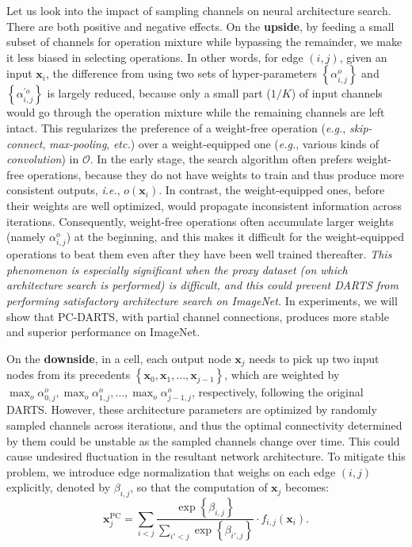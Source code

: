 \documentclass{article} \usepackage{iclr2020_conference,times}
\begin{document}
Let us look into the impact of sampling channels on neural architecture search. There are both positive and negative effects. On the \textbf{upside}, by feeding a small subset of channels for operation mixture while bypassing the remainder, we make it less biased in selecting operations. In other words, for edge $\left(i,j\right)$, given an input $\mathbf{x}_i$, the difference from using two sets of hyper-parameters $\left\{\alpha_{i,j}^o\right\}$ and $\left\{\alpha_{i,j}^{\prime o}\right\}$ is largely reduced, because only a small part ($1/K$) of input channels would go through the operation mixture while the remaining channels are left intact. This regularizes the preference of a weight-free operation (\textit{e.g.}, \textit{skip-connect}, \textit{max-pooling}, \textit{etc.}) over a weight-equipped one (\textit{e.g.}, various kinds of \textit{convolution}) in $\mathcal{O}$. In the early stage, the search algorithm often prefers weight-free operations, because they do not have weights to train and thus produce more consistent outputs, \textit{i.e.}, $o\!\left(\mathbf{x}_i\right)$. In contrast, the weight-equipped ones, before their weights are well optimized, would propagate inconsistent information across iterations. Consequently, weight-free operations often accumulate larger weights (namely $\alpha_{i,j}^o$) at the beginning, and this makes it difficult for the weight-equipped operations to beat them even after they have been well trained thereafter. \textit{This phenomenon is especially significant when the proxy dataset (on which architecture search is performed) is difficult, and this could prevent DARTS from performing satisfactory architecture search on ImageNet.} In experiments, we will show that PC-DARTS, with partial channel connections, produces more stable and superior performance on ImageNet.

On the \textbf{downside}, in a cell, each output node $\mathbf{x}_j$ needs to pick up two input nodes from its precedents $\left\{\mathbf{x}_0,\mathbf{x}_1,\ldots,\mathbf{x}_{j-1}\right\}$, which are weighted by $\max_o\alpha_{0,j}^o,\max_o\alpha_{1,j}^o,\ldots,\max_o\alpha_{j-1,j}^o$, respectively, following the original DARTS. However, these architecture parameters are optimized by randomly sampled channels across iterations, and thus the optimal connectivity determined by them could be unstable as the sampled channels change over time. This could cause undesired fluctuation in the resultant network architecture. To mitigate this problem, we introduce edge normalization that weighs on each edge $\left(i,j\right)$ explicitly, denoted by $\beta_{i,j}$, so that the computation of $\mathbf{x}_j$ becomes:
\begin{equation}\label{eqn:en}
\mathbf{x}_j^\mathrm{PC}={\sum_{i<j}\frac{\exp\left\{\beta_{i,j}\right\}}{{\sum_{i'<j}}\exp\left\{\beta_{i',j}\right\}}\cdot f_{i,j}\!\left(\mathbf{x}_i\right)}.
\end{equation}
\end{document}
